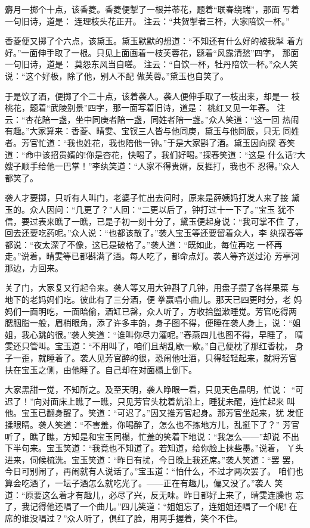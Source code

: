 麝月一掷个十点，该香菱。香菱便掣了一根并蒂花，题着“联春绕瑞”，那面
写着一句旧诗，道是：
连理枝头花正开。
注云：“共贺掣者三杯，大家陪饮一杯。”

香菱便又掷了个六点，该黛玉。黛玉默默的想道：“不知还有什么好的被我掣
着方好。”一面伸手取了一根。只见上面画着一枝芙蓉花，题着“风露清愁”四字，
那面一句旧诗，道是：
莫怨东风当自嗟。
注云：“自饮一杯，牡丹陪饮一杯。”众人笑说：“这个好极，除了他，别人不配
做芙蓉。”黛玉也自笑了。

于是饮了酒，便掷了个二十点，该着袭人。袭人便伸手取了一枝出来，却是一
枝桃花，题着“武陵别景”四字，那一面写着旧诗，道是：
桃红又见一年春。
注云：“杏花陪一盏，坐中同庚者陪一盏，同姓者陪一盏。”众人笑道：“这一回
热闹有趣。”大家算来：香菱、晴雯、宝钗三人皆与他同庚，黛玉与他同辰，只无
同姓者。芳官忙道：“我也姓花，我也陪他一钟。”于是大家斟了酒。黛玉因向探
春笑道：“命中该招贵婿的!你是杏花，快喝了，我们好喝。”探春笑道：“这是
什么话?大嫂子顺手给他一巴掌！”李纨笑道：“人家不得贵婿，反捱打，我也不
忍得。”众人都笑了。

袭人才要掷，只听有人叫门，老婆子忙出去问时，原来是薛姨妈打发人来了接
黛玉的。众人因问：“几更了？”人回：“二更以后了，钟打过十一下了。”宝玉
犹不信，要过表来瞧了一瞧，已是子初一刻十分了，黛玉便起身说：“我可掌不住
了，回去还要吃药呢。”众人说：“也都该散了。”袭人宝玉等还要留着众人，李
纨探春等都说：“夜太深了不像，这已是破格了。”袭人道：“既如此，每位再吃
一杯再走。”说着，晴雯等已都斟满了酒。每人吃了，都命点灯。袭人等齐送过沁
芳亭河那边，方回来。

关了门，大家复又行起令来。袭人等又用大钟斟了几钟，用盘子攒了各样果菜
与地下的老妈妈们吃。彼此有了三分酒，便拳赢唱小曲儿。那天已四更时分，老
妈妈们一面明吃，一面暗偷，酒缸已罄，众人听了，方收拾盥漱睡觉。芳官吃得两
腮胭脂一般，眉梢眼角，添了许多丰韵，身子图不得，便睡在袭人身上，说：“姐
姐，我心跳的很。”袭人笑道：“谁叫你尽力灌呢。”春燕四儿也图不得，早睡了，
晴雯还只管叫。宝玉道：“不用叫了，咱们且胡乱歇一歇。”自己便枕了那红香枕，
身子一歪，就睡着了。袭人见芳官醉的很，恐闹他吐酒，只得轻轻起来，就将芳官
扶在宝玉之侧，由他睡了。自己却在对面榻上倒下。

大家黑甜一觉，不知所之。及至天明，袭人睁眼一看，只见天色晶明，忙说：
“可迟了！”向对面床上瞧了一瞧，只见芳官头枕着炕沿上，睡犹未醒，连忙起来
叫他。宝玉已翻身醒了。笑道：“可迟了。”因又推芳官起身。那芳官坐起来，犹
发怔揉眼睛。袭人笑道：“不害羞，你喝醉了，怎么也不拣地方儿，乱挺下了？”
芳官听了，瞧了瞧，方知是和宝玉同榻，忙羞的笑着下地说：“我怎么——”却说
不出下半句来。宝玉笑道：“我竟也不知道了。若知道，给你脸上抹些墨。”说着，
丫头进来，伺候梳洗。宝玉笑道：“昨日有扰，今日晚上我还席。”袭人笑道：“罢
罢，今日可别闹了，再闹就有人说话了。”宝玉道：“怕什么，不过才两次罢了。
咱们也算会吃酒了，一坛子酒怎么就吃光了。——正在有趣儿，偏又没了。”袭人
笑道：“原要这么着才有趣儿，必尽了兴，反无味。昨日都好上来了，晴雯连臊也
忘了，我记得他还唱了一个曲儿。”四儿笑道：“姐姐忘了，连姐姐还唱了一个呢!
在席的谁没唱过？”众人听了，俱红了脸，用两手握着，笑个不住。

